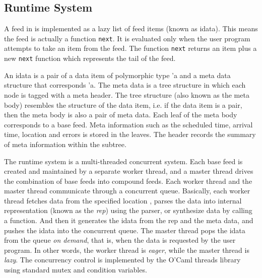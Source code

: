\subsection{Runtime System}
A feed in \padsd{} is implemented as a lazy list of feed
items (known as idata). This means the feed 
is actually a function {\tt next}. It is evaluated 
only when the user program attempts to take an
item from the feed. The function {\tt next} returns an
item plus a new {\tt next} function which represents
the tail of the feed.

An idata is a pair of a data item of polymorphic type 'a and 
a meta data structure that corresponds 'a. 
The meta data is a tree structure in which
each node is tagged with a meta header. 
The tree structure (also known as the meta body) resembles 
the structure of the data item, i.e.  if the data item is a pair, 
then the meta body is also a pair of meta data. Each leaf
of the meta body corresponds to a base feed. Meta information
such as the scheduled time, arrival time, location and 
errors is stored in the leaves. The header records the summary 
of meta information within the subtree. 

The \padsd{} runtime system is a multi-threaded concurrent
system. Each base feed is created and maintained by a separate 
worker thread, and a master thread drives the combination of 
base feeds into compound feeds. Each worker thread and the 
master thread communicate through a concurrent queue.
Basically, each worker thread fetches data from the specified
location , parses the data into internal representation 
(known as the {\em rep})
using the \padsml parser, or synthesize data by calling a function.
And then it generates the idata from the rep and the meta data,
and pushes the idata into the concurrent queue.
The master thread pops the idata from the queue {\em on demand}, that is,
when the data is requested by the user program. In other words,
the worker thread is {\em eager}, while the master thread is {\em lazy}.
The concurrency control is implemented by the O'Caml threads
library using standard mutex and condition variables.

